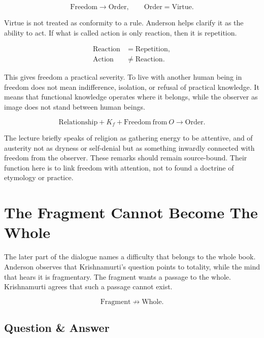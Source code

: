 \documentclass[11pt,oneside]{book}
\begin{document}
\begin{equation}
\mathrm{Freedom}
\longrightarrow
\mathrm{Order},
\qquad
\mathrm{Order}=\mathrm{Virtue}.
\end{equation}

Virtue is not treated as conformity to a rule. Anderson helps clarify it as the ability to act. If what is called action is only reaction, then it is repetition.

\begin{align}
\mathrm{Reaction} &= \mathrm{Repetition},\\
\mathrm{Action} &\neq \mathrm{Reaction}.
\end{align}

This gives freedom a practical severity. To live with another human being in freedom does not mean indifference, isolation, or refusal of practical knowledge. It means that functional knowledge operates where it belongs, while the observer as image does not stand between human beings.

\begin{equation}
\mathrm{Relationship}
+
K_f
+
\mathrm{Freedom\ from\ }O
\longrightarrow
\mathrm{Order}.
\end{equation}

The lecture briefly speaks of religion as gathering energy to be attentive, and of austerity not as dryness or self-denial but as something inwardly connected with freedom from the observer. These remarks should remain source-bound. Their function here is to link freedom with attention, not to found a doctrine of etymology or practice.

\section{The Fragment Cannot Become The Whole}

The later part of the dialogue names a difficulty that belongs to the whole book. Anderson observes that Krishnamurti's question points to totality, while the mind that hears it is fragmentary. The fragment wants a passage to the whole. Krishnamurti agrees that such a passage cannot exist.

\begin{equation}
\mathrm{Fragment}\nrightarrow\mathrm{Whole}.
\end{equation}

\subsection{Question \& Answer}
\end{document}
